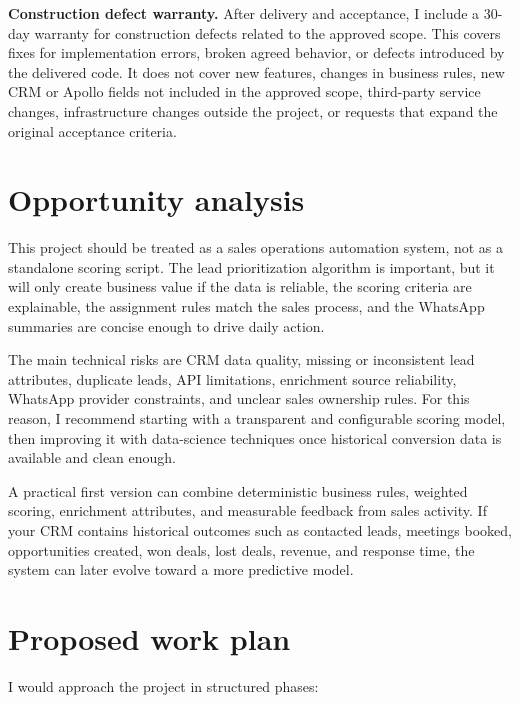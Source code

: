 \documentclass[11pt,a4paper]{article}
\begin{document}
\textbf{Construction defect warranty.} After delivery and acceptance, I include a 30-day warranty for construction defects related to the approved scope. This covers fixes for implementation errors, broken agreed behavior, or defects introduced by the delivered code. It does not cover new features, changes in business rules, new CRM or Apollo fields not included in the approved scope, third-party service changes, infrastructure changes outside the project, or requests that expand the original acceptance criteria.\par

\section*{Opportunity analysis}

This project should be treated as a sales operations automation system, not as a standalone scoring script. The lead prioritization algorithm is important, but it will only create business value if the data is reliable, the scoring criteria are explainable, the assignment rules match the sales process, and the WhatsApp summaries are concise enough to drive daily action.\par

The main technical risks are CRM data quality, missing or inconsistent lead attributes, duplicate leads, API limitations, enrichment source reliability, WhatsApp provider constraints, and unclear sales ownership rules. For this reason, I recommend starting with a transparent and configurable scoring model, then improving it with data-science techniques once historical conversion data is available and clean enough.\par

A practical first version can combine deterministic business rules, weighted scoring, enrichment attributes, and measurable feedback from sales activity. If your CRM contains historical outcomes such as contacted leads, meetings booked, opportunities created, won deals, lost deals, revenue, and response time, the system can later evolve toward a more predictive model.\par

\section*{Proposed work plan}

I would approach the project in structured phases:\par
\end{document}
